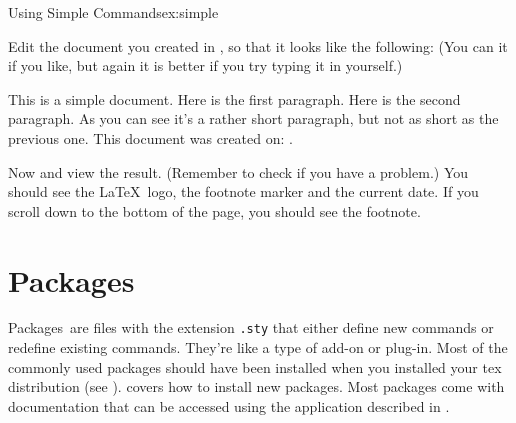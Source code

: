 \begin{exercise}{Using Simple Commands}{ex:simple}

Edit the document you created in ,
so that it looks like the following: (You can  it if
you like, but again it is better if you try typing it in yourself.)
\begin{bcode}
\oarg{12pt}\newline
\mbox{}\newline
{}\newline
\mbox{}\newline
This is a simple document.
Here is the first paragraph.\newline
\mbox{}\newline
Here is the second paragraph. 
As you can see it's a rather short paragraph, but not 
as short as the previous one. This document was 
created on: .\newline
{}
\end{bcode}

Now  and view the result.
(Remember to check 
if you have a problem.) You should see the \LaTeX\ logo, the footnote
marker and the current date.  If you scroll down to the bottom of the
page, you should see the footnote.
\end{exercise}


\section{Packages}
\label{sec:packages}

Packages\indexSTY\ are files with the extension \texttt{.sty} that
either define new \glspl{command} or redefine
existing commands.
They're like a type of add-on or plug-in. Most of the commonly used
packages should have been installed when you installed your \gls{tex}
distribution (see ).
 covers how to install new packages.
Most packages come with documentation that can be accessed using the
 application described in .

